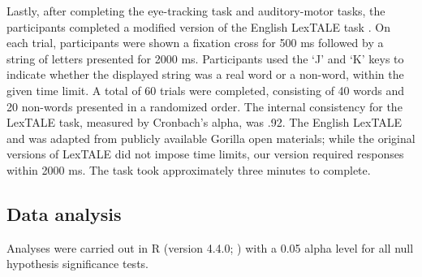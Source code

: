 Lastly, after completing the eye-tracking task and auditory-motor tasks, the participants completed a modified version of the English LexTALE task \citep{lemhofer2012introducing}. On each trial, participants were shown a fixation cross for 500 ms followed by a string of letters presented for 2000 ms. Participants used the ‘J’ and ‘K’ keys to indicate whether the displayed string was a real word or a non-word, within the given time limit. A total of 60 trials were completed, consisting of 40 words and 20 non-words presented in a randomized order. The internal consistency for the LexTALE task, measured by Cronbach’s alpha, was .92. The English LexTALE and was adapted from publicly available Gorilla open materials; while the original versions of LexTALE did not impose time limits, our version required responses within 2000 ms. The task took approximately three minutes to complete.


\subsection{Data analysis}
Analyses were carried out in R (version 4.4.0; \cite{R}) with a 0.05 alpha level for all null hypothesis significance tests. 
